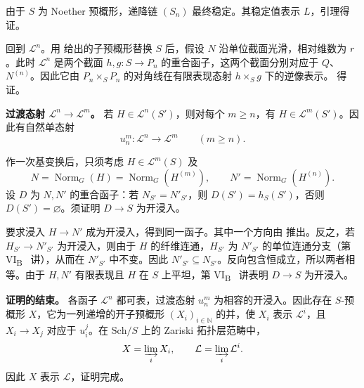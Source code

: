 由于 \(S\) 为 Noether 预概形，递降链 \((S_n)\) 最终稳定。其稳定值表示 \(L\)，引理得证。

回到 \(\mathcal L^n\)。用 给出的子预概形替换 \(S\) 后，假设 \(N\) 沿单位截面光滑，相对维数为 \(r\)。此时 \(\mathcal L^n\) 是两个截面 \(h,g:S\to P_n\) 的重合函子，这两个截面分别对应于 \(Q\)、\(N^{(n)}\)。因此它由 \(P_n\times_SP_n\) 的对角线在有限表现态射 \(h\times_Sg\) 下的逆像表示。 得证。

\medskip\noindent
\textbf{过渡态射 \(\mathcal L^n\to\mathcal L^m\)。}
若 \(H\in\mathcal L^n(S')\)，则对每个 \(m\geq n\)，有 \(H\in\mathcal L^m(S')\)。因此有自然单态射
\[
  u_n^m:\mathcal L^n\longrightarrow\mathcal L^m
  \qquad(m\geq n).
\]


作一次基变换后，只须考虑 \(H\in\mathcal L^m(S)\) 及
\[
 N=\operatorname{Norm}_G(H)=\operatorname{Norm}_G(H^{(m)}),
 \qquad
 N'=\operatorname{Norm}_G(H^{(n)}).
\]
设 \(D\) 为 \(N,N'\) 的重合函子：若 \(N_{S'}=N'_{S'}\)，则 \(D(S')=h_S(S')\)，否则 \(D(S')=\varnothing\)。须证明 \(D\to S\) 为开浸入。

要求浸入 \(H\to N'\) 成为开浸入，得到同一函子。其中一个方向由 推出。反之，若 \(H_{S'}\to N'_{S'}\) 为开浸入，则由于 \(H\) 的纤维连通，\(H_{S'}\) 为 \(N'_{S'}\) 的单位连通分支（第 VI\textsubscript{B}~ 讲），从而在 \(N'_{S'}\) 中不变。因此 \(N'_{S'}\subseteq N_{S'}\)。反向包含恒成立，所以两者相等。由于 \(H,N'\) 有限表现且 \(H\) 在 \(S\) 上平坦，第 VI\textsubscript{B}~ 讲表明 \(D\to S\) 为开浸入。

\medskip\noindent\textbf{ 证明的结束。}
各函子 \(\mathcal L^n\) 都可表，过渡态射 \(u_n^m\) 为相容的开浸入。因此存在 \(S\)-预概形 \(X\)，它为一列递增的开子预概形 \((X_i)_{i\in\mathbb N}\) 的并，使 \(X_i\) 表示 \(\mathcal L^i\)，且 \(X_i\to X_j\) 对应于 \(u_i^j\)。在 \(\mathrm{Sch}/S\) 上的 Zariski 拓扑层范畴中，
\[
  X=\varinjlim_iX_i,\qquad
  \mathcal L=\varinjlim_i\mathcal L^i.
\]
因此 \(X\) 表示 \(\mathcal L\)，证明完成。


